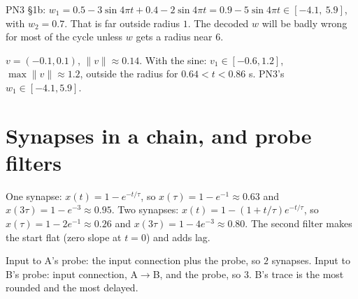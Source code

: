 \documentclass[11pt,letterpaper]{article}
\newcommand{\ans}[1]{\par\vspace{4pt}{\bfseries #1}\quad}
\begin{document}
PN3 \S1b: $w_1 = 0.5 - 3\sin 4\pi t + 0.4 - 2\sin 4\pi t = 0.9 - 5\sin 4\pi t \in [-4.1,\ 5.9]$, with $w_2 = 0.7$. That is far outside radius $1$. The decoded $w$ will be badly wrong for most of the cycle unless $w$ gets a radius near $6$.
\begin{center}
\end{center}
\begin{result}
$v = (-0.1, 0.1)$, $\|v\| \approx 0.14$. With the sine: $v_1 \in [-0.6, 1.2]$, $\max\|v\| \approx 1.2$, outside the radius for $0.64 < t < 0.86$ s. PN3's $w_1 \in [-4.1, 5.9]$.
\end{result}

\section{Synapses in a chain, and probe filters}

\ans{Q1}
One synapse: $x(t) = 1 - e^{-t/\tau}$, so $x(\tau) = 1 - e^{-1} \approx 0.63$ and $x(3\tau) = 1 - e^{-3} \approx 0.95$.
Two synapses: $x(t) = 1 - (1 + t/\tau)e^{-t/\tau}$, so $x(\tau) = 1 - 2e^{-1} \approx 0.26$ and $x(3\tau) = 1 - 4e^{-3} \approx 0.80$. The second filter makes the start flat (zero slope at $t = 0$) and adds lag.

\ans{Q2}
Input to A's probe: the input connection plus the probe, so $2$ synapses. Input to B's probe: input connection, A$\to$B, and the probe, so $3$. B's trace is the most rounded and the most delayed.
\end{document}
